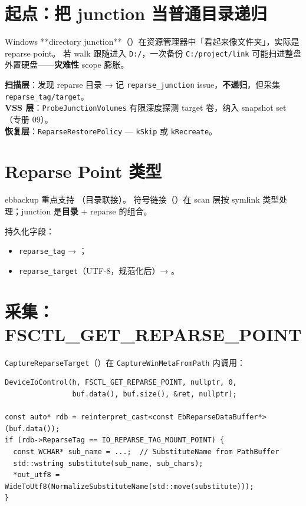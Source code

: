 
\section{起点：把 junction 当普通目录递归}

Windows **directory junction**（）在资源管理器中「看起来像文件夹」，实际是 reparse point。
若 walk 跟随进入 \texttt{D:/}，一次备份 \texttt{C:/project/link} 可能扫进整盘外置硬盘——\textbf{灾难性} scope 膨胀。

\begin{evolbox}
\textbf{扫描层}：发现 reparse 目录 → 记 \texttt{reparse\_junction} issue，\textbf{不递归}，但采集 \texttt{reparse\_tag/target}。\\
\textbf{VSS 层}：\texttt{ProbeJunctionVolumes} 有限深度探测 target 卷，纳入 snapshot set（专册 09）。\\
\textbf{恢复层}：\texttt{ReparseRestorePolicy} — \texttt{kSkip} 或 \texttt{kRecreate}。
\end{evolbox}

\section{Reparse Point 类型}

ebbackup 重点支持 （目录联接）。
符号链接（）在 scan 层按 symlink 类型处理；junction 是\textbf{目录} + reparse 的组合。

持久化字段：
\begin{itemize}[nosep]
  \item \texttt{reparse\_tag} → ；
  \item \texttt{reparse\_target}（UTF-8，规范化后）→ 。
\end{itemize}

\section{采集：FSCTL\_GET\_REPARSE\_POINT}

\texttt{CaptureReparseTarget}（）在 \texttt{CaptureWinMetaFromPath} 内调用：

\begin{lstlisting}[caption={CaptureReparseTarget (win\_meta.cc)}]
DeviceIoControl(h, FSCTL_GET_REPARSE_POINT, nullptr, 0,
                buf.data(), buf.size(), &ret, nullptr);

const auto* rdb = reinterpret_cast<const EbReparseDataBuffer*>(buf.data());
if (rdb->ReparseTag == IO_REPARSE_TAG_MOUNT_POINT) {
  const WCHAR* sub_name = ...;  // SubstituteName from PathBuffer
  std::wstring substitute(sub_name, sub_chars);
  *out_utf8 = WideToUtf8(NormalizeSubstituteName(std::move(substitute)));
}
\end{lstlisting}


